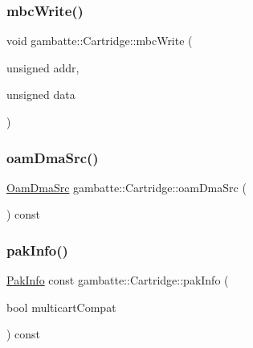 \mbox{\label{classgambatte_1_1Cartridge_ac560daf65ec58dfaee2b0142a2bc54af}} 
\subsubsection{\texorpdfstring{mbc\+Write()}{mbcWrite()}}
{\footnotesize\ttfamily void gambatte\+::\+Cartridge\+::mbc\+Write (\begin{DoxyParamCaption}\item[{unsigned}]{addr,  }\item[{unsigned}]{data }\end{DoxyParamCaption})\hspace{0.3cm}{\ttfamily [inline]}}

\mbox{\label{classgambatte_1_1Cartridge_a32f9d2af10d44c526005df6c15f56e18}} 
\subsubsection{\texorpdfstring{oam\+Dma\+Src()}{oamDmaSrc()}}
{\footnotesize\ttfamily \hyperlink{namespacegambatte_a2c5520a5fadf732ba8907450d802f51b}{Oam\+Dma\+Src} gambatte\+::\+Cartridge\+::oam\+Dma\+Src (\begin{DoxyParamCaption}{ }\end{DoxyParamCaption}) const\hspace{0.3cm}{\ttfamily [inline]}}

\mbox{\label{classgambatte_1_1Cartridge_aea12a1156e0af20786acca153daeea54}} 
\subsubsection{\texorpdfstring{pak\+Info()}{pakInfo()}}
{\footnotesize\ttfamily \hyperlink{classgambatte_1_1PakInfo}{Pak\+Info} const gambatte\+::\+Cartridge\+::pak\+Info (\begin{DoxyParamCaption}\item[{bool}]{multicart\+Compat }\end{DoxyParamCaption}) const}

